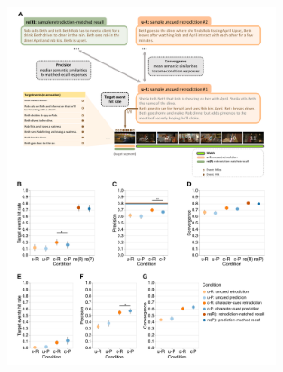 \documentclass[10pt]{article}
\providecommand{\DIFaddbeginFL}{} %
\providecommand{\DIFdelbeginFL}{} %
\providecommand{\DIFdelendFL}{} %
\newcommand{\DIFscaledelfig}{0.5}
\newlength{\DIFdelgraphicswidth} %
\newlength{\DIFdelgraphicsheight} %
\newcommand{\DIFaddincludegraphics}[2][]{{\color{blue}\fbox{\DIFOincludegraphics[#1]{#2}}}} %
\newcommand{\DIFdelincludegraphics}[2][]{%
\sbox{\DIFdelgraphicsbox}{\DIFOincludegraphics[#1]{#2}}%
\settoboxwidth{\DIFdelgraphicswidth}{\DIFdelgraphicsbox} %
\settoboxtotalheight{\DIFdelgraphicsheight}{\DIFdelgraphicsbox} %
\scalebox{\DIFscaledelfig}{%
\parbox[b]{\DIFdelgraphicswidth}{\usebox{\DIFdelgraphicsbox}\\[-\baselineskip] \rule{\DIFdelgraphicswidth}{0em}}\llap{\resizebox{\DIFdelgraphicswidth}{\DIFdelgraphicsheight}{%
\setlength{\unitlength}{\DIFdelgraphicswidth}%
\begin{picture}(1,1)%
\thicklines\linethickness{2pt} %
{\color[rgb]{1,0,0}\put(0,0){\framebox(1,1){}}}%
{\color[rgb]{1,0,0}\put(0,0){\line( 1,1){1}}}%
{\color[rgb]{1,0,0}\put(0,1){\line(1,-1){1}}}%
\end{picture}%
}\hspace*{3pt}}} %
} %
\DeclareRobustCommand{\DIFaddbeginFL}{\DIFOaddbeginFL \let\includegraphics\DIFaddincludegraphics} %
\DeclareRobustCommand{\DIFdelbeginFL}{\DIFOdelbeginFL \let\includegraphics\DIFdelincludegraphics} %
\DeclareRobustCommand{\DIFdelendFL}{\DIFOaddendFL \let\includegraphics\DIFOincludegraphics} %
\begin{document}
\begin{figure}[tp]
  \centering
  \DIFdelbeginFL %
\DIFdelendFL \DIFaddbeginFL \includegraphics[width=0.7\textwidth]{results1}


\end{figure}
\end{document}
